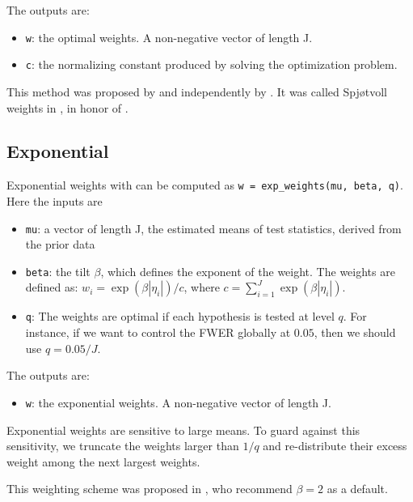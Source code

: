 \documentclass[english,11pt]{article} %
\begin{document}
The outputs are: 
\begin{itemize}
\item \verb+w+:  the optimal weights. A non-negative vector of length J.
\item \verb+c+:  the normalizing constant produced by solving the optimization problem.
\end{itemize}

This method was proposed by \cite{wasserman2006weighted, roeder2009genome} and independently by \cite{rubin2006method}. It was called Spj\o tvoll weights in  \cite{dobriban2015optimal}, in honor of \citep{spjotvoll1972optimality}.

\subsection{Exponential}

Exponential weights with can be computed as \verb+w = exp_weights(mu, beta, q)+. Here the inputs are 

\begin{itemize}
\item \verb+mu+:  a vector of length J, the estimated means of test statistics, derived from the prior data
\item \verb+beta+:  the tilt $\beta$, which defines the exponent of the weight. The weights are defined as: $w_i = \exp(\beta|\eta_i|)/c$, where $c = \sum_{i=1}^{J}  \exp(\beta |\eta_i|)$.
\item \verb+q+: The weights are optimal if each hypothesis is tested at level $q$. For instance, if we want to control the FWER globally at $0.05$, then we should use $q = 0.05/J$.
\end{itemize}

The outputs are: 
\begin{itemize}
\item \verb+w+:  the exponential weights. A non-negative vector of length J.
\end{itemize}

Exponential weights are sensitive to large means. To guard against this sensitivity, we truncate the weights larger than $1/q$ and re-distribute their excess weight among the next largest weights. 

This weighting scheme was proposed in \citep{roeder2006using}, who recommend $\beta = 2$ as a default. 
\end{document}
